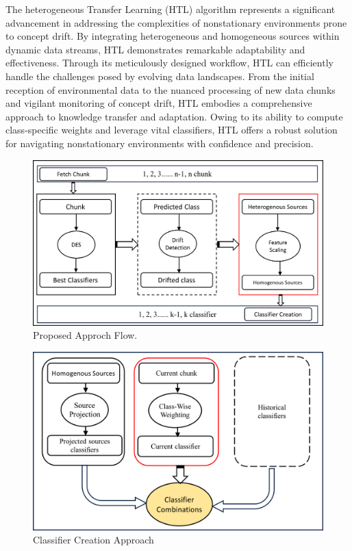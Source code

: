 The heterogeneous Transfer Learning (HTL) algorithm represents a significant advancement in addressing the complexities of nonstationary environments prone to concept drift. By integrating heterogeneous and homogeneous sources within dynamic data streams, HTL demonstrates remarkable adaptability and effectiveness. Through its meticulously designed workflow, HTL can efficiently handle the challenges posed by evolving data landscapes. From the initial reception of environmental data to the nuanced processing of new data chunks and vigilant monitoring of concept drift, HTL embodies a comprehensive approach to knowledge transfer and adaptation. Owing to its ability to compute class-specific weights and leverage vital classifiers, HTL offers a robust solution for navigating nonstationary environments with confidence and precision.


\begin{figure}[!ht]
	\centering
	\includegraphics[width=1\linewidth]{6_transfer_learning/figures/alg1.png}
	\caption{Proposed Approch Flow.}
	\label{fig:6_alg1}
\end{figure}
\begin{figure}[!ht]
	\centering
	\includegraphics[width=1\linewidth]{6_transfer_learning/figures/alg2.png}
	\caption{Classifier Creation Approach}
	\label{fig:6_alg2}
\end{figure}


